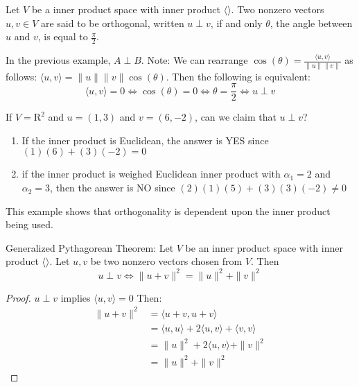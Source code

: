 \documentclass[12pt]{article}
\begin{document}
\begin{definition} Let $V$ be a inner product space with inner product $\langle \rangle$. Two nonzero vectors $u, v \in V$ are said to be orthogonal, written $u \perp v$, if and only $\theta$, the angle between $u$ and $v$, is equal to $\frac{\pi}{2}$. \end{definition} 
In the previous example, $A \perp B$. \newline
Note: We can rearrange $\cos(\theta) = \frac{\langle u, v \rangle}{\|u\| \|v\|}$ as follows: $\langle u, v\rangle = \|u\| \|v\|\cos(\theta)$. Then the following is equivalent: $$\langle u, v \rangle = 0 \iff \cos(\theta) = 0 \iff \theta = \frac{\pi}{2} \iff u \perp v $$
\begin{example} If $V = \mathrm{R}^2$ and $u = (1, 3)$ and $v = (6, -2)$, can we claim that $u \perp v$? \begin{enumerate} 
\item If the inner product is Euclidean, the answer is YES since $(1)(6) + (3)(-2) = 0$
\item if the inner product is weighed Euclidean inner product with $\alpha_1 = 2$ and $\alpha_2 = 3$, then the answer is NO since $(2)(1)(5) + (3)(3)(-2) \neq 0$ \end{enumerate} \end{example} 
This example shows that orthogonality is dependent upon the inner product being used. 
\begin{theorem} Generalized Pythagorean Theorem: Let $V$ be an inner product space with inner product $\langle \rangle$. Let $u, v$ be two nonzero vectors chosen from $V$. Then $$ u \perp v \iff \|u + v \|^2 = \|u\|^2 + \|v\|^2 $$ \end{theorem} 
\begin{proof} $ u \perp v $ implies $\langle u, v \rangle = 0$ Then: $$\begin{aligned} \|u + v\|^2 &= \langle u + v, u + v \rangle \\ &= \langle u, u \rangle + 2 \langle u, v \rangle + \langle v, v \rangle \\ &= \|u\|^2 + 2\langle u, v \rangle + \|v\|^2 \\ &= \|u\|^2 + \|v\|^2 \end{aligned} $$ \end{proof} 
\end{document}
